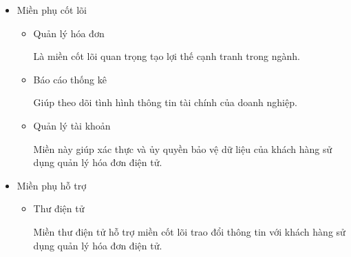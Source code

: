 \begin{itemize}
\begin{itemize}
              \item Miền phụ cốt lõi

                    \begin{itemize}

                        \item Quản lý hóa đơn

                              Là miền cốt lõi quan trọng tạo lợi thế cạnh tranh trong ngành.

                        \item Báo cáo thống kê

                              Giúp theo dõi tình hình thông tin tài chính của doanh nghiệp.



                        \item Quản lý  tài khoản

                              Miền này giúp xác thực và ủy quyền bảo vệ dữ liệu của khách hàng sử dụng  quản lý hóa đơn điện tử.

                    \end{itemize}

              \item Miền phụ hỗ trợ

                    \begin{itemize}

                        \item Thư điện tử

                              Miền thư điện tử hỗ trợ miền cốt lõi trao đổi thông tin với khách hàng sử dụng  quản lý hóa đơn điện tử.

                    \end{itemize}

          \end{itemize}

\end{itemize}